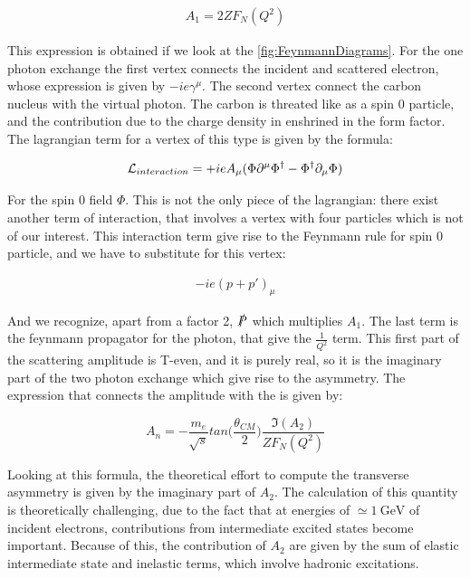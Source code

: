 \begin{align*}
A_{1} = 2Z F_{N}(Q^{2})
\end{align*} 

This expression is obtained if we look at the \ref{fig:FeynmannDiagrams}. For the one photon exchange the first vertex connects the incident and scattered electron, whose expression is given by $-ie \gamma^{\mu}$. The second vertex connect the carbon nucleus with the virtual photon. The carbon is threated like as a spin $0$ particle, and the contribution due to the charge density in enshrined in the form factor. The lagrangian term for a vertex of this type is given by the formula: 

\begin{equation}
\mathcal{L}_{interaction} = +ieA_{\mu}(\Phi \partial^{\mu} \Phi^{\dag} - \Phi^{\dag}\partial_{\mu} \Phi)
\end{equation}

For the spin 0 field $\Phi$. This is not the only piece of the lagrangian: there exist another term of interaction, that involves a vertex with four particles which is not of our interest. This interaction term give rise to the Feynmann rule for spin 0 particle, and we have to substitute for this vertex:

\begin{align*}
-ie(p + p')_{\mu}
\end{align*} 

And we recognize, apart from a factor 2, $\slashed{P}$ which multiplies $A_{1}$. The last term is the feynmann propagator for the photon, that give the $\frac{1}{Q^{2}}$ term. This first part of the scattering amplitude is T-even, and it is purely real, so it is the imaginary part of the two photon exchange which give rise to the asymmetry. The expression that connects the amplitude with the \transv is given by:

\begin{equation} \label{eq:integral}
A_{n} = -\frac{m_{e}}{\sqrt{s}} tan \bigl (\frac{\theta_{CM}}{2} \bigl) \dfrac{\Im(A_{2})}{ZF_{N}(Q^{2})}
\end{equation}

Looking at this formula, the theoretical effort to compute the transverse asymmetry is given by the imaginary part of $A_{2}$. The calculation of this quantity is theoretically challenging, due to the fact that at energies of $\simeq \SI{1}{\giga \electronvolt}$ of incident electrons, contributions from intermediate excited states become important. Because of this, the contribution of $A_{2}$ are given by the sum of elastic intermediate state and inelastic terms, which involve hadronic excitations.

